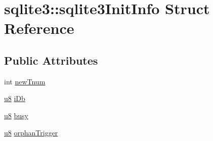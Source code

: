 \hypertarget{structsqlite3_1_1sqlite3_init_info}{\section{sqlite3\-:\-:sqlite3\-Init\-Info Struct Reference}
\label{structsqlite3_1_1sqlite3_init_info}
}
\subsection*{Public Attributes}
\begin{DoxyCompactItemize}
\item 
int \hyperlink{structsqlite3_1_1sqlite3_init_info_a65250c8c5f215989e64294ede6c1c268}{new\-Tnum}
\item 
\hyperlink{sqlite3_8c_a74a0f6424ae628af25f23f0a35f6ead3}{u8} \hyperlink{structsqlite3_1_1sqlite3_init_info_af72389cb54753544c0f578605e6604bb}{i\-Db}
\item 
\hyperlink{sqlite3_8c_a74a0f6424ae628af25f23f0a35f6ead3}{u8} \hyperlink{structsqlite3_1_1sqlite3_init_info_a6ac01842e0ae68023cb60fea93bd8688}{busy}
\item 
\hyperlink{sqlite3_8c_a74a0f6424ae628af25f23f0a35f6ead3}{u8} \hyperlink{structsqlite3_1_1sqlite3_init_info_ac292839cc81d109206133a80949c45a6}{orphan\-Trigger}
\end{DoxyCompactItemize}


